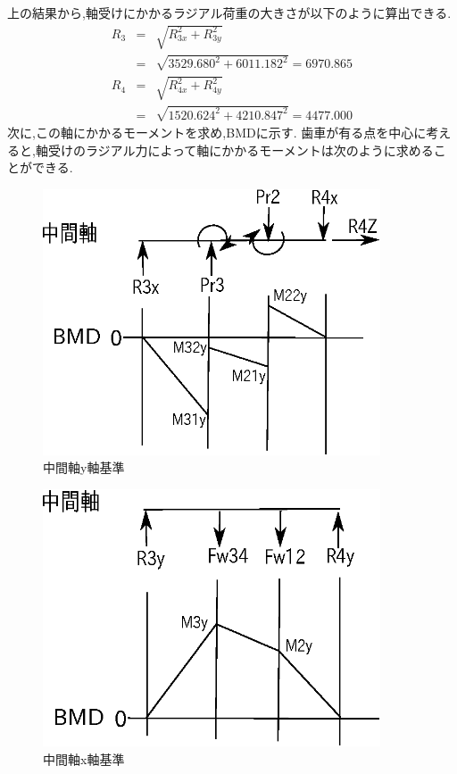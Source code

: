\documentclass[a4j,twoside,openright,11pt]{jreport}
\begin{document}
上の結果から,軸受けにかかるラジアル荷重の大きさが以下のように算出できる.
\begin{eqnarray}
R_3 &=& \sqrt {R_{3x}^2+R_{3y}^2}\\
    &=& \sqrt {3529.680^2+6011.182^2}=6970.865\\
R_4 &=& \sqrt {R_{4x}^2+R_{4y}^2}\\
    &=& \sqrt {1520.624^2+4210.847^2}=4477.000
\end{eqnarray}
次に,この軸にかかるモーメントを求め,BMDに示す.
歯車が有る点を中心に考えると,軸受けのラジアル力によって軸にかかるモーメントは次のように求めることができる.
\begin{figure}[htbp]
\begin{center}
\includegraphics[width=10cm]{jiku44.eps}
\end{center}
\caption{中間軸y軸基準}
\end{figure}
\begin{figure}[htbp]
\begin{center}
\includegraphics[width=10cm]{jiku46.eps}
\end{center}
\caption{中間軸x軸基準}
\end{figure}
\end{document}
